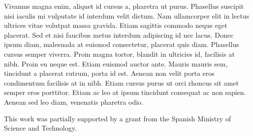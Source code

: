 \documentclass[draft,wrr]{AGUTeX}
\begin{document}
\begin{article}
Vivamus magna enim, aliquet id cursus a, pharetra ut purus. Phasellus suscipit nisi iaculis mi vulputate id interdum velit dictum. Nam ullamcorper elit in lectus ultrices vitae volutpat massa gravida. Etiam sagittis commodo neque eget placerat. Sed et nisi faucibus metus interdum adipiscing id nec lacus. Donec ipsum diam, malesuada at euismod consectetur, placerat quis diam. Phasellus cursus semper viverra. Proin magna tortor, blandit in ultricies id, facilisis at nibh. Proin eu neque est. Etiam euismod auctor ante. Mauris mauris sem, tincidunt a placerat rutrum, porta id est. Aenean non velit porta eros condimentum facilisis at in nibh. Etiam cursus purus ut orci rhoncus sit amet semper eros porttitor. Etiam ac leo at ipsum tincidunt consequat ac non sapien. Aenean sed leo diam, venenatis pharetra odio.


%
%
%


\begin{acknowledgments}
This work was partially supported by a grant from the Spanish Ministry of Science and Technology.
\end{acknowledgments}


\end{article}
\end{document}
